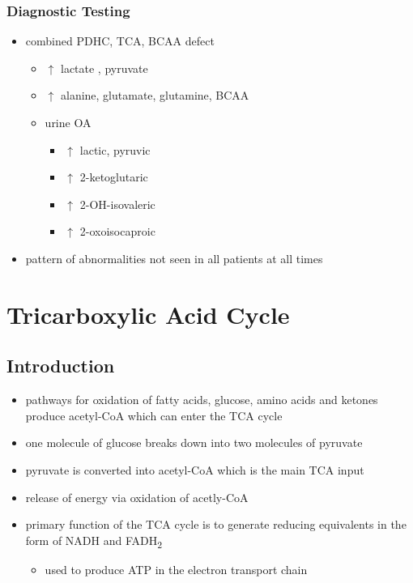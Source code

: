 \documentclass[12pt]{scrartcl}
\begin{document}
\subsubsection{Diagnostic Testing}
\label{sec:org0abc402}
\begin{itemize}
\item combined PDHC, TCA, BCAA defect
\begin{itemize}
\item \(\uparrow\) lactate , pyruvate
\item \(\uparrow\) alanine, glutamate, glutamine, BCAA
\item urine OA
\begin{itemize}
\item \(\uparrow\) lactic, pyruvic
\item \(\uparrow\) 2-ketoglutaric
\item \(\uparrow\) 2-OH-isovaleric
\item \(\uparrow\) 2-oxoisocaproic
\end{itemize}
\end{itemize}
\item pattern of abnormalities not seen in all patients at all times
\end{itemize}
\section{Tricarboxylic Acid Cycle}
\label{sec:org0c064c1}
\subsection{Introduction}
\label{sec:org85f155b}
\begin{itemize}
\item pathways for oxidation of fatty acids, glucose, amino acids and
ketones produce acetyl-CoA which can enter the TCA cycle
\item one molecule of glucose breaks down into two molecules of pyruvate
\item pyruvate is converted into acetyl-CoA which is the main TCA input
\item release of energy via oxidation of acetly-CoA
\item primary function of the TCA cycle is to generate reducing
equivalents in the form of NADH and FADH\textsubscript{2}
\begin{itemize}
\item used to produce ATP in the electron transport chain
\end{itemize}
\end{itemize}
\end{document}
